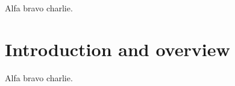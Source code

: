 \documentclass{amsart}
\begin{document}
\noindent Alfa bravo charlie.

\section{Introduction and overview}
Alfa bravo charlie.
\end{document}
